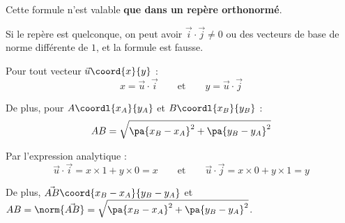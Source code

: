 \begin{attention}
	Cette formule n'est valable \textbf{que dans un repère orthonormé}.

	Si le repère est quelconque, on peut avoir $\vec{i} \cdot \vec{j} \neq 0$ ou des vecteurs de base de norme différente de $1$, et la formule est fausse.
\end{attention}

\newpage

\begin{propriete}
	Pour tout vecteur $\vec{u}\coord{x}{y}$ :
	\[
		x = \vec{u} \cdot \vec{i}\qquad\text{et}\qquad y = \vec{u} \cdot \vec{j}
	\]

	De plus, pour $A\coordl{x_A}{y_A}$ et $B\coordl{x_B}{y_B}$ :
	\[
		AB = \sqrt{\pa{x_B - x_A}^2 + \pa{y_B - y_A}^2}
	\]
\end{propriete}

\begin{demonstration}
	Par l'expression analytique :
	\[
		\vec{u} \cdot \vec{i} = x \times 1 + y \times 0 = x\qquad\text{et}\qquad\vec{u} \cdot \vec{j} = x \times 0 + y \times 1 = y
	\]

	De plus, $\vec{AB}\coord{x_B - x_A}{y_B - y_A}$ et $AB = \norm{\vec{AB}}=\sqrt{\pa{x_B - x_A}^2 + \pa{y_B - y_A}^2}$.
\end{demonstration}

